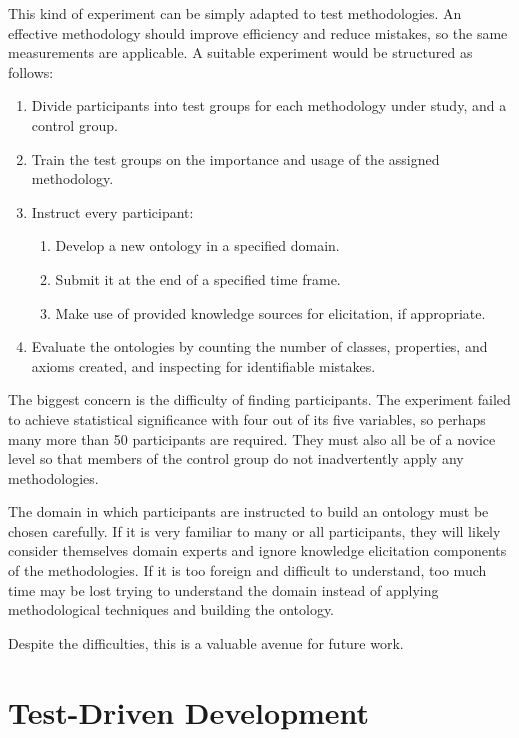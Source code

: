 \documentclass{sig-alternate}
\begin{document}
This kind of experiment can be simply adapted to test methodologies.  An effective methodology should improve efficiency and reduce mistakes, so the same measurements are applicable.  A suitable experiment would be structured as follows:
\begin{enumerate}[noitemsep]
  \item Divide participants into test groups for each methodology under study, and a control group.
  \item Train the test groups on the importance and usage of the assigned methodology.
  \item Instruct every participant:
  \begin{enumerate}[nosep]
    \item Develop a new ontology in a specified domain.
    \item Submit it at the end of a specified time frame.
    \item Make use of provided knowledge sources for elicitation, if appropriate.
  \end{enumerate}
  \item Evaluate the ontologies by counting the number of classes, properties, and axioms created, and inspecting for identifiable mistakes.
\end{enumerate}

The biggest concern is the difficulty of finding participants.  The experiment failed to achieve statistical significance with four out of its five variables, so perhaps many more than 50 participants are required.  They must also all be of a novice level so that members of the control group do not inadvertently apply any methodologies.

The domain in which participants are instructed to build an ontology must be chosen carefully.  If it is very familiar to many or all participants, they will likely consider themselves domain experts and ignore knowledge elicitation components of the methodologies.  If it is too foreign and difficult to understand, too much time may be lost trying to understand the domain instead of applying methodological techniques and building the ontology.

Despite the difficulties, this is a valuable avenue for future work.

\section{Test-Driven Development}
\label{sec:tdd}
\end{document}
